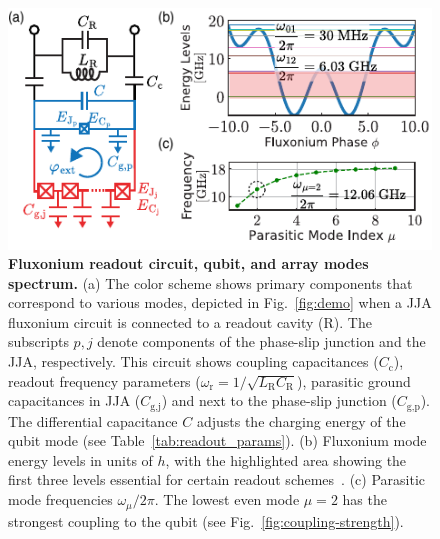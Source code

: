 \documentclass[%
reprint,
superscriptaddress,
 amsmath,amssymb,
 aps,
 prx,
longbibliography,
floatfix,
]{revtex4-2}
\begin{document}
\begin{figure}[t]
\centering    
\includegraphics[width=\linewidth]{Figures/Meas_Circuit.pdf}
\caption{{\bf Fluxonium readout circuit, qubit, and array modes spectrum.} (a) The color scheme shows primary components that correspond to various modes, depicted in Fig.~\ref{fig:demo} when a JJA fluxonium circuit is connected to a readout cavity (R). The subscripts $p,j$ denote components of the phase-slip junction and the JJA, respectively. This circuit shows coupling capacitances ($C_\textrm{c}$), readout frequency parameters ($\omega_\textrm{r}=1/\sqrt{L_\textrm{R}C_\textrm{R}}$), parasitic ground capacitances in JJA ($C_\textrm{g,j}$) and next to the phase-slip junction ($C_\textrm{g,p}$). The differential capacitance $C$ adjusts the charging energy of the qubit mode (see Table~\ref{tab:readout_params}). (b) Fluxonium mode energy levels in units of $h$, with the highlighted area showing the first three levels essential for certain readout schemes~\cite{zhang_universal_2021}. (c) Parasitic mode frequencies $\omega_\mu/2\pi$. The lowest even mode $\mu = 2$ has the strongest coupling to the qubit (see Fig.~\ref{fig:coupling-strength}).
}
\label{fig:meas_circuit}
\end{figure}
\end{document}
